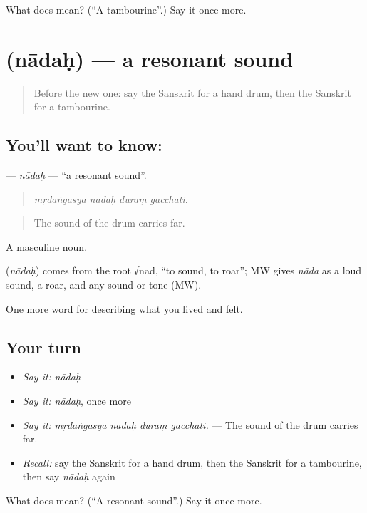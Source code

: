 \begin{tcolorbox}[breakable,colback=teal!4,colframe=teal!35!black,title={Before you move on}]
What does  mean? (\textquotedblleft{}A tambourine\textquotedblright{}.) Say it once more.
\end{tcolorbox}
\section[\texorpdfstring{\sk{नादः} (nādaḥ)}{नादः (nādaḥ)}]{ (nādaḥ) — a resonant sound}

\label{lesson:SA-C521-nadah}



\begin{quote}
Before the new one: say the Sanskrit for a hand drum, then the Sanskrit for a tambourine.
\end{quote}

\subsection*{You'll want to know: }
\textbf{} — \emph{nādaḥ} — \textquotedblleft{}a resonant sound\textquotedblright{}.

\begin{quote}
   
\end{quote}

\begin{quote}
\emph{mṛdaṅgasya nādaḥ dūraṃ gacchati.}
\end{quote}

\begin{quote}
The sound of the drum carries far.
\end{quote}

A masculine noun.

\begin{cousinweb}
\textbf{} (\emph{nādaḥ}) comes from the root √nad, \textquotedblleft{}to sound, to roar\textquotedblright{}; MW gives \emph{nāda} as a loud sound, a roar, and any sound or tone (MW).
\end{cousinweb}

\begin{grammarlens}[title={What you've built}]
One more word for describing what you lived and felt.
\end{grammarlens}

\subsection*{Your turn}
\begin{itemize}
\raggedright
  \item \emph{Say it:} \emph{nādaḥ}
  \item \emph{Say it:} \emph{nādaḥ}, once more
  \item \emph{Say it:} \emph{mṛdaṅgasya nādaḥ dūraṃ gacchati.} — The sound of the drum carries far.
  \item \emph{Recall:} say the Sanskrit for a hand drum, then the Sanskrit for a tambourine, then say \emph{nādaḥ} again
\end{itemize}

\begin{tcolorbox}[breakable,colback=teal!4,colframe=teal!35!black,title={Before you move on}]
What does  mean? (\textquotedblleft{}A resonant sound\textquotedblright{}.) Say it once more.
\end{tcolorbox}
